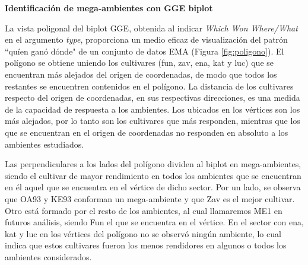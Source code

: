 \textbf{Identificación de mega-ambientes con GGE biplot}

La vista poligonal del biplot GGE, obtenida al indicar \emph{Which Won Where/What} en el argumento \emph{type}, proporciona un medio eficaz de visualización del patrón ``quíen ganó dónde"  de un conjunto de datos EMA (Figura \ref{fig:poligono}).  El polígono se obtiene uniendo los cultivares (fun, zav, ena, kat y luc) que se encuentran más alejados del origen de coordenadas, de modo que todos los restantes se encuentren contenidos en el polígono. La distancia de los cultivares respecto del origen de coordenadas, en sus respectivas direcciones, es una medida de la capacidad de respuesta a los ambientes. Los ubicados en los vértices son los más alejados, por lo tanto son los cultivares que más responden, mientras que los que se encuentran en el origen de coordenadas no responden en absoluto a los ambientes estudiados.

Las perpendiculares a los lados del polígono dividen al biplot en mega-ambientes, siendo el cultivar de mayor rendimiento en todos los ambientes que se encuentran en él aquel que se encuentra en el vértice de dicho sector. Por un lado, se observa que OA93 y KE93 conforman un mega-ambiente y que Zav es el mejor cultivar. Otro está formado por el resto de los ambientes, al cual llamaremos ME1 en futuros análisis, siendo Fun el que se encuentra en el vértice. En el sector con ena, kat y luc en los vértices del polígono no se observó ningún ambiente, lo cual indica que estos cultivares fueron los menos rendidores en algunos o todos los ambientes considerados.\\

